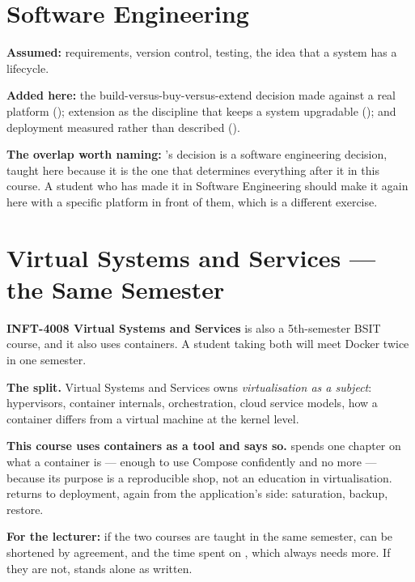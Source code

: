 \section{Software Engineering}

\begin{tight}
  \item \textbf{Assumed:} requirements, version control, testing, the idea that
        a system has a lifecycle.
  \item \textbf{Added here:} the build-versus-buy-versus-extend decision made
        against a real platform (); extension as the discipline
        that keeps a system upgradable (); and deployment
        measured rather than described ().
  \item \textbf{The overlap worth naming:} 's decision is a
        software engineering decision, taught here because it is the one that
        determines everything after it in this course. A student who has made
        it in Software Engineering should make it again here with a specific
        platform in front of them, which is a different exercise.
\end{tight}

\section{Virtual Systems and Services --- the Same Semester}

\begin{alertbox}
\textbf{INFT-4008 Virtual Systems and Services} is also a 5th-semester BSIT
course, and it also uses containers. A student taking both will meet Docker
twice in one semester.

\smallskip
\textbf{The split.} Virtual Systems and Services owns \emph{virtualisation as a
subject}: hypervisors, container internals, orchestration, cloud service
models, how a container differs from a virtual machine at the kernel level.

\smallskip
\textbf{This course uses containers as a tool and says so.}  spends
one chapter on what a container is --- enough to use Compose confidently and no
more --- because its purpose is a reproducible shop, not an education in
virtualisation.  returns to deployment, again from the
application's side: saturation, backup, restore.

\smallskip
\textbf{For the lecturer:} if the two courses are taught in the same semester,
 can be shortened by agreement, and the time spent on
, which always needs more. If they are not, 
stands alone as written.
\end{alertbox}

